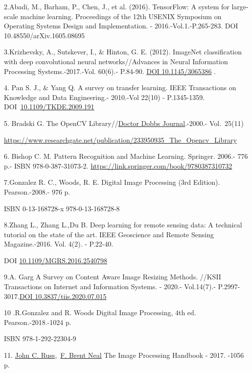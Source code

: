 \documentclass[
]{article}
\begin{document}
2.Abadi, M., Barham, P., Chen, J., et al. (2016). TensorFlow: A system
for large-scale machine learning. Proceedings of the 12th USENIX
Symposium on Operating Systems Design and Implementation. -
2016.-Vol.1.-P.265-283. DOI 10.48550/arXiv.1605.08695

3.Krizhevsky, A., Sutskever, I., \& Hinton, G. E. (2012). ImageNet
classification with deep convolutional neural networks//Advances in
Neural Information Processing Systems.-2017.-Vol. 60(6).- P.84-90.
\href{https://dl.acm.org/doi/10.1145/3065386}{DOI 10.1145/3065386} .

4. Pan S. J., \& Yang Q. A survey on transfer learning. IEEE
Transactions on Knowledge and Data Engineering.- 2010.-Vol 22(10) -
P.1345-1359.
DOI~\href{https://doi.org/10.1109/TKDE.2009.191}{10.1109/TKDE.2009.191}

5. Bradski G. The OpenCV
Library//\href{https://www.researchgate.net/journal/Doctor-Dobbs-Journal-1044-789X?_tp=eyJjb250ZXh0Ijp7ImZpcnN0UGFnZSI6InB1YmxpY2F0aW9uIiwicGFnZSI6InB1YmxpY2F0aW9uIn19}{Doctor
Dobbs Journal}.-2000.- Vol.~25(11)

\url{https://www.researchgate.net/publication/233950935_The_Opencv_Library}

6. Bishop C. M. Pattern Recognition and Machine Learning. Springer.
2006.- 776 p.- ISBN 978-0-387-31073-2.
\url{https://link.springer.com/book/9780387310732}

7.Gonzalez R. C., Woods, R. E. Digital Image Processing (3rd Edition).
Pearson.-2008.- 976 p.

ISBN 0-13-168728-x 978-0-13-168728-8

8.Zhang L., Zhang L.,Du B. Deep learning for remote sensing data: A
technical tutorial on the state of the art. IEEE Geoscience and Remote
Sensing Magazine.-2016. Vol. 4(2). - P.22-40.

DOI
\href{http://dx.doi.org/10.1109/MGRS.2016.2540798}{10.1109/MGRS.2016.2540798}

9.A. Garg A Survey on Content Aware Image Resizing Methods. //KSII
Transactions on Internet and Information Systems. - 2020.- Vol.14(7).-
P.2997-3017.\href{https://doi.org/10.3837/tiis.2020.07.015}{DOI
10.3837/tiis.2020.07.015}

10 .R.Gonzalez and R. Woods Digital Image Processing, 4th ed.
Pearson.-2018.-1024 p.

ISBN 978-1-292-22304-9

11.
\href{https://www.google.kz/search?hl=ru&tbo=p&tbm=bks&q=inauthor:\%22John+C.+Russ\%22}{John
C.
Russ},~\href{https://www.google.kz/search?hl=ru&tbo=p&tbm=bks&q=inauthor:\%22F.+Brent+Neal\%22}{F.
Brent Neal} The Image Processing Handbook - 2017. -1056 p.
\end{document}
